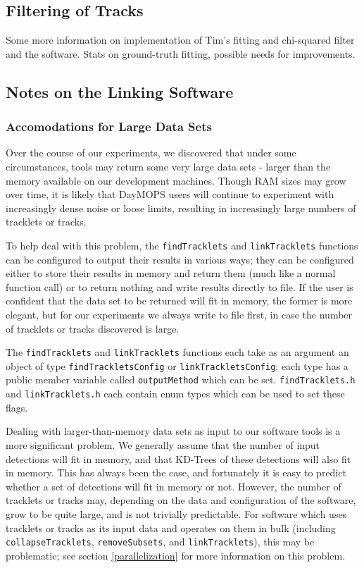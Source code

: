 \subsection{Filtering of Tracks}
\label{trackFilters}
Some more information on implementation of Tim's fitting and
chi-squared filter and the software. Stats on ground-truth fitting,
possible needs for improvements.


\subsection{Notes on the Linking Software}

\subsubsection{Accomodations for Large Data Sets}
\label{largeData}
Over the course of our experiments, we discovered that under some
circumstances, tools may return some very large data sets - larger
than the memory available on our development machines.  Though RAM
sizes may grow over time, it is likely that DayMOPS users will
continue to experiment with increasingly dense noise or loose limits,
resulting in increasingly large numbers of tracklets or tracks.

To help deal with this problem, the {\tt  findTracklets} and
{\tt linkTracklets} functions can be configured to output their results
in various ways; they can be configured either to store their results
in memory and return them (much like a normal function call) or to
return nothing and write results directly to file.  If the user is
confident that the data set to be returned will fit in memory, the
former is more elegant, but for our experiments we always write to
file first, in case the number of tracklets or tracks discovered is
large.

The {\tt findTracklets} and {\tt linkTracklets} functions each take as
an argument an object of type {\tt findTrackletsConfig} or
{\tt linkTrackletsConfig}; each type has a public member variable
called {\tt outputMethod} which can be set.  {\tt findTracklets.h} and
{\tt linkTracklets.h} each contain enum types which can be used to set
these flags.

Dealing with larger-than-memory data sets as input to our software
tools is a more significant problem.  We generally assume that the
number of input detections will fit in memory, and that KD-Trees of
these detections will also fit in memory.  This has always been the
case, and fortunately it is easy to predict whether a set of
detections will fit in memory or not.  However, the number of
tracklets or tracks may, depending on the data and configuration of
the software, grow to be quite large, and is not trivially
predictable.  For software which uses tracklets or tracks as its input
data and operates on them in bulk (including {\tt collapseTracklets},
{\tt removeSubsets}, and {\tt linkTracklets}), this may be problematic;
see section \ref{parallelization} for more information on this
problem.




